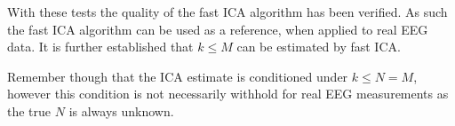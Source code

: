 With these tests the quality of the fast ICA algorithm has been verified. As such the fast ICA algorithm can be used as a reference, when applied to real EEG data. It is further established that $k\leq M$ can be estimated by fast ICA. 

Remember though that the ICA estimate is conditioned under $k\leq N=M$, however this condition is not necessarily withhold for real EEG measurements as the true $N$ is always unknown.   











  



